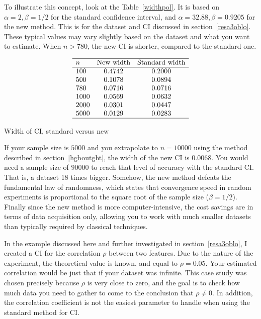 \documentclass[oneside,10pt]{book}
\renewcommand{\arraystretch}{1.4} %
\begin{document}
To illustrate this concept, look at the Table~\ref{widthpol}. It is based on $\alpha = 2, \beta = 1/2$ for the standard confidence interval,   and $\alpha = 32.88, \beta=0.9205$ for the new method. This is for the
 dataset and CI discussed in section~\ref{resa3oblo}.  These typical values may vary slightly based on the dataset and what you want to estimate. When $n>780$, the new CI is shorter, compared to the standard one.

\renewcommand{\arraystretch}{1.0} %
\renewcommand{\arraystretch}{1.2} %
\begin{table}[H]
\small
\[
\begin{array}{lcc}
\hline
 n  &  \text{New width} & \text{Standard width} \\
\hline
100	& 0.4742	&0.2000\\
500	& 0.1078	&0.0894\\
780	&0.0716	&0.0716\\
1000	&0.0569	&0.0632\\
2000	&0.0301	&0.0447\\
5000	&0.0129	&0.0283\\
\hline
\end{array}
\]
\caption{\label{widthpol} Width of CI, standard versus new}
\end{table}
\renewcommand{\arraystretch}{1.0} %

If your sample size is $5000$ and you extrapolate to $n=\num{10000}$ using the method described in section~\ref{hgboutght},
 the width of the new CI is $0.0068$. You would need a sample size of $\num{90000}$ to reach that level of accuracy with the standard CI. That is, a dataset 18 times bigger. Somehow, the new method defeats the fundamental law of randomness, which states that convergence speed in random experiments is
 proportional to the square root of the sample size ($\beta = 1/2$). Finally since the new method is more computer-intensive, the cost savings are in terms of data acquisition only, allowing you to work with much smaller datasets than typically required by classical
  techniques.

In the example discussed here and further investigated in section~\ref{resa3oblo}, I created a CI for the correlation $\rho$ between two features. Due to the nature of the experiment, the theoretical value is known, and equal to $\rho = 0.05$. Your estimated correlation  would  be just that if your dataset was infinite. This case study was chosen precisely because $\rho$ is very close to zero, and the goal is
 to check how much data you need to gather to come to the conclusion that $\rho\neq 0$. In addition, the correlation coefficient is not the easiest parameter to handle when using the standard method for CI.
\end{document}
